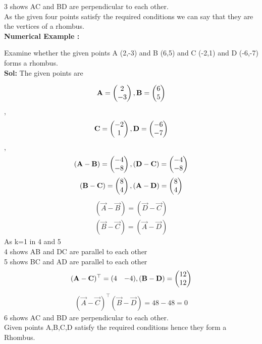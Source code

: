 \documentclass{article}
\begin{document}
{3 shows AC and BD are perpendicular to each other.}\\ 

{As the given four points satisfy the required conditions we can say that they are the vertices of a rhombus.}\\
 
\textbf{Numerical Example :}
 
{Examine whether the given points A (2,-3) and B (6,5) and C (-2,1) and D (-6,-7) forms a rhombus.}\\

 \textbf{Sol:}
 The given points are

$$\mathbf{A} = \begin{pmatrix}2\\-3\end{pmatrix}, \mathbf{B} =\begin{pmatrix}6\\5\end{pmatrix}$$,
$$\mathbf{C} =\begin{pmatrix}-2\\1\end{pmatrix}, \mathbf{D} =\begin{pmatrix}-6\\-7\end{pmatrix}$$,
$$(\mathbf{A}-\mathbf{B} ) = \begin{pmatrix}-4\\-8\end{pmatrix}, (\mathbf{D}-\mathbf{C} ) = \begin{pmatrix}-4\\-8\end{pmatrix}$$
$$(\mathbf{B}-\mathbf{C} ) = \begin{pmatrix}8\\4\end{pmatrix}, (\mathbf{A}-\mathbf{D} ) = \begin{pmatrix}8\\4\end{pmatrix}$$
\begin{align}
(\vec{A}-\vec{B} ) = (\vec{D}-\vec{C} )  \\
(\vec{B}-\vec{C} )  = (\vec{A}-\vec{D} ) 
 \end{align}
 {As k=1 in 4 and 5}\\
{4 shows AB and DC are parallel to each other}\\
{5 shows BC and AD are parallel to each other}
$$(\mathbf{A}-\mathbf{C} )^\top = \begin{matrix}
(4 & -4 )
\end{matrix},(\mathbf{B}-\mathbf{D} ) = \begin{pmatrix}12\\12\end{pmatrix}$$
 \begin{align}
(\vec{A}-\vec{C} )^ \top ( \vec{B}-\vec{D} ) = 48-48 = 0
 \end{align}
{6 shows AC and BD are perpendicular to each other.}\\

{Given points A,B,C,D satisfy the required 
conditions hence they form a Rhombus.}

\end{document}
